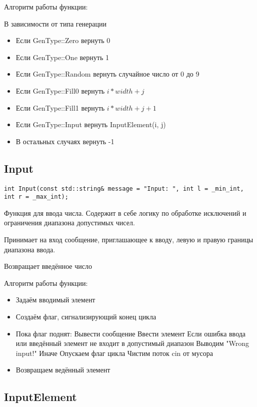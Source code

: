 \documentclass[12pt,a4paper]{article}  %
\begin{document}
	Алгоритм работы функции:

	В зависимости от типа генерации
	\begin{itemize}
		\item Если GenType::Zero вернуть 0
		\item Если GenType::One вернуть 1
		\item Если GenType::Random вернуть случайное число от 0 до 9
		\item Если GenType::Fill0 вернуть $ i*width+j $
		\item Если GenType::Fill1 вернуть $ i*width+j+1 $
		\item Если GenType::Input вернуть InputElement(i, j)
		\item В остальных случаях вернуть -1
	\end{itemize}

	\subsection*{Input}

	\begin{lstlisting}[label={lst:Input}]
		int Input(const std::string& message = "Input: ", int l = _min_int, int r = _max_int);
	\end{lstlisting}

	Функция для ввода числа.
	Содержит в себе логику по обработке исключений и
	ограничения диапазона допустимых чисел.

	Принимает на вход сообщение, приглашающее к вводу,
	левую и правую границы диапазона ввода.

	Возвращает введённое число

	Алгоритм работы функции:

	\begin{itemize}
		\item Задаём вводимый элемент
		\item Создаём флаг, сигнализирующий конец цикла
		\item Пока флаг поднят:
		\subitem Вывести сообщение
		\subitem Ввести элемент
		\subitem Если ошибка ввода или введённый элемент не входит в допустимый диапазон
		\subsubitem Выводим "Wrong input!"
		\subitem Иначе
		\subsubitem Опускаем флаг цикла
		\subitem Чистим поток cin от мусора
		\item Возвращаем ведённый элемент
	\end{itemize}

	\subsection*{InputElement}
\end{document}
